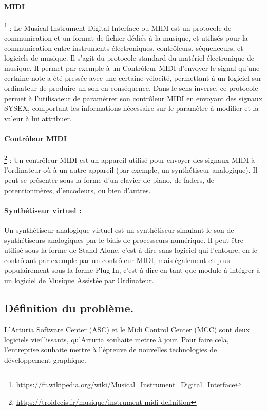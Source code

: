 \documentclass[francais]{rapportPFE}  %
\begin{document}
\paragraph{MIDI} \footnote{\url{https://fr.wikipedia.org/wiki/Musical_Instrument_Digital_Interface}} 
: Le Musical Instrument Digital Interface ou MIDI est un protocole de communication et un format de fichier dédiés à la musique, et utilisés pour la communication entre instruments électroniques, contrôleurs, séquenceurs, et logiciels de musique. Il s'agit du protocole standard du matériel électronique de musique. Il permet par exemple à un Contrôleur MIDI d'envoyer le signal qu'une certaine note a été pressée avec une certaine vélocité, permettant à un logiciel sur ordinateur de produire un son en conséquence. Dans le sens inverse, ce protocole permet à l'utilisateur de paramétrer son contrôleur MIDI en envoyant des signaux SYSEX, comportant les informations nécessaire sur le paramètre à modifier et la valeur à lui attribuer.
\paragraph{Contrôleur MIDI} \footnote{\url{https://troidecis.fr/musique/instrument-midi-definition}} 
:  Un contrôleur MIDI est un appareil utilisé pour envoyer des signaux MIDI à l'ordinateur où à un autre appareil (par exemple, un synthétiseur analogique). Il peut se présenter sous la forme d'un clavier de piano, de faders, de potentionmères, d'encodeurs, ou bien d'autres.
\paragraph{Synthétiseur virtuel :} Un synthétiseur analogique virtuel est un synthétiseur simulant le son de synthétiseurs analogiques par le biais de processeurs numérique. Il peut être utilisé sous la forme de Stand-Alone, c'est à dire sans logiciel qui l'entoure, en le contrôlant par exemple par un contrôleur MIDI, mais également et plus populairement sous la forme Plug-In, c'est à dire en tant que module à intégrer à un logiciel de Musique Assistée par Ordinateur.

\subsection{Définition du problème.}
L'Arturia Software Center (ASC) et le Midi Control Center (MCC) sont deux logiciels vieillissants, qu'Arturia souhaite mettre à jour. Pour faire cela, l'entreprise souhaite mettre à l'épreuve de nouvelles technologies de développement graphique.
\end{document}
